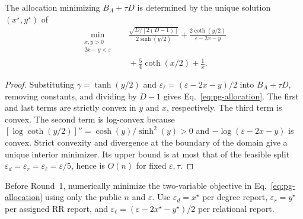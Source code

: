 \begin{proposition}\label{prop:pg-allocation}
The allocation minimizing $B_A+\tau D$ is determined by the unique solution $(x^\star,y^\star)$ of
\begin{equation}
\begin{aligned}
\min_{\substack{x,y>0\\2x+y<\varepsilon}}\quad
 &\frac{\sqrt{D/[2(D-1)]}}{2\sinh(y/2)}
  +\frac{2\coth(y/2)}{\varepsilon-2x-y}\\[-1pt]
 &{}+\frac54\coth(x/2)+\frac1x .
\end{aligned}
\label{eq:pg-allocation}
\end{equation}
\end{proposition}
\begin{proof}
Substituting $\gamma=\tanh(y/2)$ and $\varepsilon_\ell=(\varepsilon-2x-y)/2$ into $B_A+\tau D$, removing constants, and dividing by $D-1$ gives Eq.~\eqref{eq:pg-allocation}.
The first and last terms are strictly convex in $y$ and $x$, respectively. The third term is convex.
The second term is log-convex because $[\log\coth(y/2)]''=\cosh(y)/\sinh^2(y)>0$ and $-\log(\varepsilon-2x-y)$ is convex.
Strict convexity and divergence at the boundary of the  domain give a unique interior minimizer. Its upper bound is at most that of the feasible split $\varepsilon_d=\varepsilon_r=\varepsilon_\ell=\varepsilon/5$, hence is $O(n)$ for fixed $\varepsilon,\tau$.
\end{proof}
Before Round~1, numerically minimize the two-variable objective in Eq.~\eqref{eq:pg-allocation} using only the public $n$ and $\varepsilon$.
Use $\varepsilon_d=x^\star$ per degree report, $\varepsilon_r=y^\star$ per assigned RR report, and $\varepsilon_\ell=(\varepsilon-2x^\star-y^\star)/2$ per relational report.
